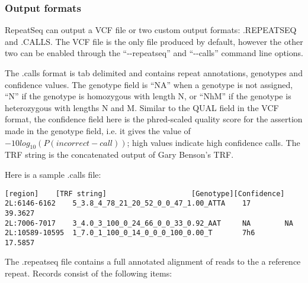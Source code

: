 \documentclass[11pt]{article}
\begin{document}
\subsubsection {Output formats}
RepeatSeq can output a VCF file or two custom output formats: .REPEATSEQ and .CALLS. The VCF file is the only file produced by default, however the other two can be enabled through the “{-}{-}repeatseq” and “{-}{-}calls” command line options.

The .calls format is tab delimited and contains repeat annotations, genotypes and confidence values. The genotype field is “NA” when a genotype is not assigned, “N” if the genotype is homozygous with length N, or “NhM” if the genotype is heterozygous with lengths N and M. Similar to the QUAL field in the VCF format, the confidence field here is the phred-scaled quality score for the assertion made in the genotype field, i.e. it gives the value of $-10log_{10} ( P(incorrect-call ))$; high values indicate high confidence calls. The TRF string is the concatenated output of Gary Benson's TRF.

Here is a sample .calls file:

\begin{verbatim}
[region]	[TRF string]			        [Genotype][Confidence]
2L:6146-6162    5_3.8_4_78_21_20_52_0_0_47_1.00_ATTA    17        39.3627
2L:7006-7017    3_4.0_3_100_0_24_66_0_0_33_0.92_AAT     NA        NA
2L:10589-10595  1_7.0_1_100_0_14_0_0_0_100_0.00_T       7h6       17.5857
\end{verbatim}

The .repeatseq file contains a full annotated alignment of reads to the a reference repeat. Records consist of the following items:
\end{document}
